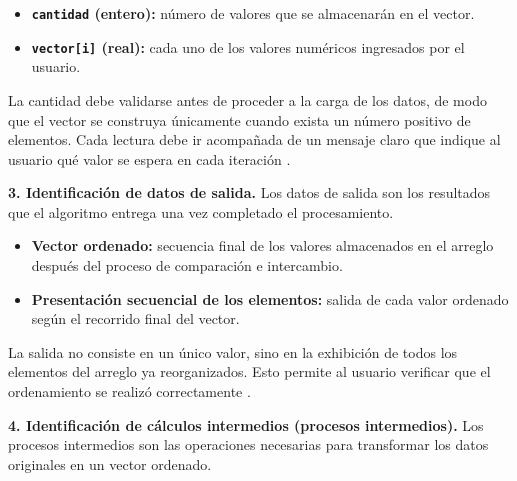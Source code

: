 \documentclass[12pt,twoside]{book}
\begin{document}
						\begin{itemize}
							\item \textbf{\texttt{cantidad} (entero):} número de valores que se almacenarán en el vector.
							\item \textbf{\texttt{vector[i]} (real):} cada uno de los valores numéricos ingresados por el usuario.
						\end{itemize}
						
						\noindent
						La cantidad debe validarse antes de proceder a la carga de los datos, de modo que el vector se construya únicamente cuando exista un número positivo de elementos. Cada lectura debe ir acompañada de un mensaje claro que indique al usuario qué valor se espera en cada iteración \cite{Gaddis2022Starting,Farrell2018Programming}.
						
						\noindent
						\textbf{3. Identificación de datos de salida.}
						Los datos de salida son los resultados que el algoritmo entrega una vez completado el procesamiento.
						
						\begin{itemize}
							\item \textbf{Vector ordenado:} secuencia final de los valores almacenados en el arreglo después del proceso de comparación e intercambio.
							\item \textbf{Presentación secuencial de los elementos:} salida de cada valor ordenado según el recorrido final del vector.
						\end{itemize}
						
						\noindent
						La salida no consiste en un único valor, sino en la exhibición de todos los elementos del arreglo ya reorganizados. Esto permite al usuario verificar que el ordenamiento se realizó correctamente \cite{Farrell2018Programming,Gaddis2022Starting}.
						
						\noindent
						\textbf{4. Identificación de cálculos intermedios (procesos intermedios).}
						Los procesos intermedios son las operaciones necesarias para transformar los datos originales en un vector ordenado.
						
\end{document}
